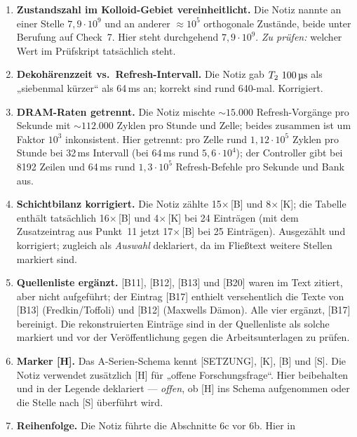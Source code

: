 \begin{enumerate}[leftmargin=1.6em,itemsep=0.4em]
  \item \textbf{Zustandszahl im Kolloid-Gebiet vereinheitlicht.} Die Notiz nannte
        an einer Stelle $7{,}9\cdot10^{9}$ und an anderer ${\approx}10^{5}$
        orthogonale Zustände, beide unter Berufung auf Check~7. Hier steht
        durchgehend $7{,}9\cdot10^{9}$. \emph{Zu prüfen:} welcher Wert im
        Prüfskript tatsächlich steht.
  \item \textbf{Dekohärenzzeit vs.\ Refresh-Intervall.} Die Notiz gab
        $T_2 \sim 100\,\text{\textmu s}$ als „siebenmal kürzer“ als 64\,ms an;
        korrekt sind rund 640-mal. Korrigiert.
  \item \textbf{DRAM-Raten getrennt.} Die Notiz mischte ${\sim}15{.}000$
        Refresh-Vorgänge pro Sekunde mit ${\sim}112{.}000$ Zyklen pro Stunde und
        Zelle; beides zusammen ist um Faktor $10^{3}$ inkonsistent. Hier
        getrennt: pro Zelle rund $1{,}12\cdot10^{5}$ Zyklen pro Stunde bei
        32\,ms Intervall (bei 64\,ms rund $5{,}6\cdot10^{4}$); der Controller
        gibt bei 8192 Zeilen und 64\,ms rund $1{,}3\cdot10^{5}$ Refresh-Befehle
        pro Sekunde und Bank aus.
  \item \textbf{Schichtbilanz korrigiert.} Die Notiz zählte
        15$\times$\,[B] und 8$\times$\,[K]; die Tabelle enthält tatsächlich
        16$\times$\,[B] und 4$\times$\,[K] bei 24 Einträgen (mit dem
        Zusatzeintrag aus Punkt~11 jetzt 17$\times$\,[B] bei 25 Einträgen). Ausgezählt und
        korrigiert; zugleich als \emph{Auswahl} deklariert, da im Fließtext
        weitere Stellen markiert sind.
  \item \textbf{Quellenliste ergänzt.} [B11], [B12], [B13] und [B20] waren im Text
        zitiert, aber nicht aufgeführt; der Eintrag [B17] enthielt versehentlich
        die Texte von [B13] (Fredkin/Toffoli) und [B12] (Maxwells Dämon). Alle
        vier ergänzt, [B17] bereinigt. Die rekonstruierten Einträge sind in der
        Quellenliste als solche markiert und vor der Veröffentlichung gegen die
        Arbeitsunterlagen zu prüfen.
  \item \textbf{Marker [H].} Das A-Serien-Schema kennt [SETZUNG], [K], [B] und
        [S]. Die Notiz verwendet zusätzlich [H] für „offene Forschungsfrage“.
        Hier beibehalten und in der Legende deklariert --- \emph{offen}, ob [H]
        ins Schema aufgenommen oder die Stelle nach [S] überführt wird.
  \item \textbf{Reihenfolge.} Die Notiz führte die Abschnitte 6c vor 6b. Hier in

\end{enumerate}

